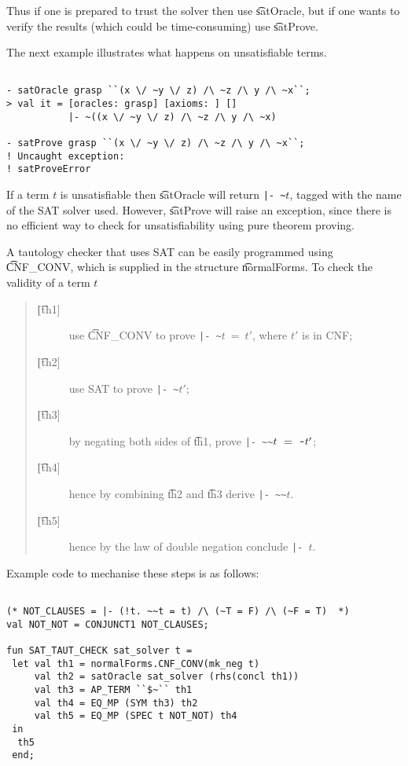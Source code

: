 Thus if one is prepared to trust the solver then use \t{satOracle},
but if one wants to verify the results (which could be time-consuming)
use \t{satProve}.


The next example illustrates what happens on unsatisfiable terms.

\begin{session}\begin{verbatim}

- satOracle grasp ``(x \/ ~y \/ z) /\ ~z /\ y /\ ~x``;
> val it = [oracles: grasp] [axioms: ] [] 
           |- ~((x \/ ~y \/ z) /\ ~z /\ y /\ ~x)

- satProve grasp ``(x \/ ~y \/ z) /\ ~z /\ y /\ ~x``;
! Uncaught exception: 
! satProveError

\end{verbatim}\end{session}

If a term $t$ is unsatisfiable then \t{satOracle} will return {\small\verb+|- ~+}$t$,
tagged with the name of the SAT solver used. However, \t{satProve} will raise an exception,
since there is no efficient way to check for unsatisfiability using pure \HOL{} theorem proving.

A tautology checker that uses SAT can be easily programmed using
\t{CNF\_CONV}, which is supplied in the structure \t{normalForms}. To check the validity of a term $t$

\begin{quote}
\begin{description}
\item[\t{[th1]}] use \t{CNF\_CONV} to prove {\small\verb+|- ~+}$t~=~t'$, where $t'$ is in CNF;
\item[\t{[th2]}] use SAT to prove  {\small\verb+|- ~+}$t'$;
\item[\t{[th3]}] by negating both sides of \t{th1}, prove {\small\verb+|- ~~+}$t~=~{\verb+~+}t'$;
\item[\t{[th4]}] hence by combining \t{th2} and \t{th3} derive {\small\verb+|- ~~+}$t$.
\item[\t{[th5]}] hence by the law of double negation conclude {\small\verb+|- +}$t$.
\end{description}
\end{quote}

Example \HOL{} code to mechanise these steps is as follows:

\begin{session}\begin{verbatim}

(* NOT_CLAUSES = |- (!t. ~~t = t) /\ (~T = F) /\ (~F = T)  *)
val NOT_NOT = CONJUNCT1 NOT_CLAUSES;

fun SAT_TAUT_CHECK sat_solver t =
 let val th1 = normalForms.CNF_CONV(mk_neg t)
     val th2 = satOracle sat_solver (rhs(concl th1))
     val th3 = AP_TERM ``$~`` th1
     val th4 = EQ_MP (SYM th3) th2
     val th5 = EQ_MP (SPEC t NOT_NOT) th4
 in
  th5
 end;

\end{verbatim}\end{session}
